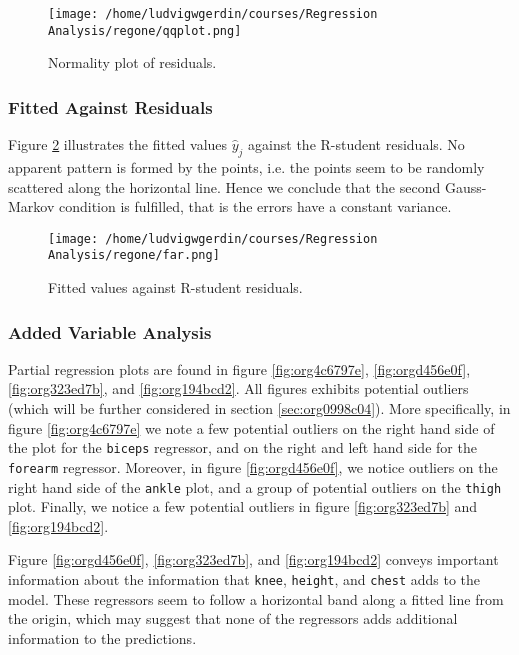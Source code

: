 \documentclass[11pt]{article}
\begin{document}
\begin{figure}[htbp]
\centering
\texttt{[image: /home/ludvigwgerdin/courses/Regression Analysis/regone/qqplot.png]}
\caption{\label{fig:org4858269}
Normality plot of residuals.}
\end{figure}

\subsubsection{Fitted Against Residuals}
\label{sec:orgb245f0b}

Figure \ref{fig:org0eca6f1} illustrates the fitted values \(\hat y_j\) against the R-student residuals. No apparent 
pattern is formed by the points, i.e. the points seem to be randomly scattered along the horizontal line.
Hence we conclude that the second Gauss-Markov condition is fulfilled, that is the errors have a constant 
variance.

\begin{figure}[htbp]
\centering
\texttt{[image: /home/ludvigwgerdin/courses/Regression Analysis/regone/far.png]}
\caption{\label{fig:org0eca6f1}
Fitted values against R-student residuals.}
\end{figure}

\subsubsection{Added Variable Analysis}
\label{sec:org5c68f25}

Partial regression plots are found in figure \ref{fig:org4c6797e}, \ref{fig:orgd456e0f},
\ref{fig:org323ed7b}, and \ref{fig:org194bcd2}. All figures exhibits potential outliers 
(which will be further considered in section \ref{sec:org0998c04}).
More specifically, in figure \ref{fig:org4c6797e} we note a 
few potential outliers on the right hand side of the plot for the \texttt{biceps} regressor, and on the
right and left hand side for the \texttt{forearm} regressor. Moreover, in figure \ref{fig:orgd456e0f}, we 
notice outliers on the right hand side of the \texttt{ankle} plot, and a group of potential outliers on the
\texttt{thigh} plot. Finally, we notice a few potential outliers in figure \ref{fig:org323ed7b} and 
\ref{fig:org194bcd2}.

Figure \ref{fig:orgd456e0f}, \ref{fig:org323ed7b}, and \ref{fig:org194bcd2} 
conveys important information about the information that \texttt{knee}, \texttt{height}, and
\texttt{chest} adds to the model. These regressors seem to follow a horizontal band along a fitted 
line from the origin, which may suggest that none of the regressors adds additional information 
to the predictions.
\end{document}
